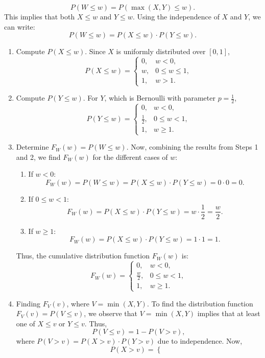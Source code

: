 \[
P(W \leq w) = P(\max(X, Y) \leq w).
\]
This implies that both \( X \leq w \) and \( Y \leq w \). Using the independence of \( X \) and \( Y \), we can write:
\[
P(W \leq w) = P(X \leq w) \cdot P(Y \leq w).
\]
\begin{enumerate}
    \item Compute \( P(X \leq w) \). Since \( X \) is uniformly distributed over \([0, 1]\),
\[
P(X \leq w) = 
\begin{cases} 
0, & w < 0, \\
w, & 0 \leq w \leq 1, \\
1, & w > 1.
\end{cases}
\]
    \item Compute \( P(Y \leq w) \). For \( Y \), which is Bernoulli with parameter \( p = \frac{1}{2} \),
\[
P(Y \leq w) = 
\begin{cases} 
0, & w < 0, \\
\frac{1}{2}, & 0 \leq w < 1, \\
1, & w \geq 1.
\end{cases}
\]
    \item Determine \( F_W(w) = P(W \leq w) \). Now, combining the results from Steps 1 and 2, we find \( F_W(w) \) for the different cases of \( w \):
\begin{enumerate}
    \item {If \( w < 0 \):}
   \[
   F_W(w) = P(W \leq w) = P(X \leq w) \cdot P(Y \leq w) = 0 \cdot 0 = 0.
   \]
   \item {If \( 0 \leq w < 1 \):}
   \[
   F_W(w) = P(X \leq w) \cdot P(Y \leq w) = w \cdot \frac{1}{2} = \frac{w}{2}.
   \]
   \item {If \( w \geq 1 \):}
   \[
   F_W(w) = P(X \leq w) \cdot P(Y \leq w) = 1 \cdot 1 = 1.
   \]
\end{enumerate}
Thus, the cumulative distribution function \( F_W(w) \) is:
\[
F_W(w) = 
\begin{cases} 
0, & w < 0, \\
\frac{w}{2}, & 0 \leq w < 1, \\
1, & w \geq 1.
\end{cases}
\]
\item Finding \( F_V(v) \), where \( V = \min(X, Y) \). To find the distribution function \( F_V(v) = P(V \leq v) \), we observe that \( V = \min(X, Y) \) implies that at least one of \( X \leq v \) or \( Y \leq v \). Thus,
\[
P(V \leq v) = 1 - P(V > v),
\]
where \( P(V > v) = P(X > v) \cdot P(Y > v) \) due to independence. Now,
\[
P(X > v) = 
\begin{cases} 

\end{cases}\]
\end{enumerate}
